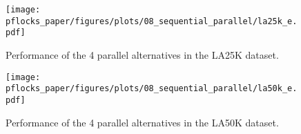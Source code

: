 \begin{figure}
    \centering
    \texttt{[image: pflocks\_paper/figures/plots/08\_sequential\_parallel/la25k\_e.pdf]}
    \caption{Performance of the 4 parallel alternatives in the LA25K dataset.}\label{fig:la25k_e}
\end{figure}

\begin{figure}
    \centering
    \texttt{[image: pflocks\_paper/figures/plots/08\_sequential\_parallel/la50k\_e.pdf]}
    \caption{Performance of the 4 parallel alternatives in the LA50K dataset.}\label{fig:la50k_e}
\end{figure}
